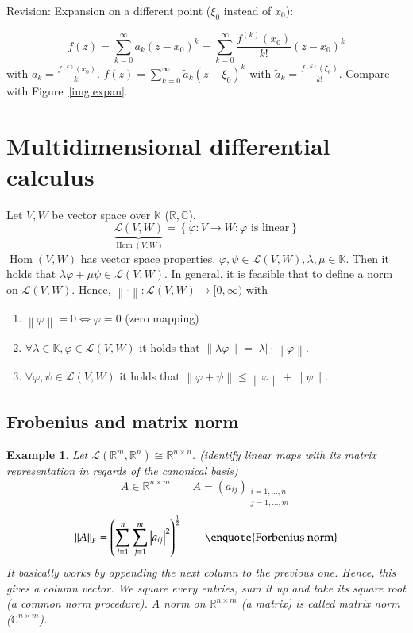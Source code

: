 \documentclass{article}
\newtheorem{example}{Example}  \numberwithin{example}{section}
\newcommand{\set}[1]{\left\{#1\right\}}
\newcommand{\norm}[1]{\left\|#1\right\|}
\newcommand{\card}[1]{\left|#1\right|}
\begin{document}
Revision: Expansion on a different point ($\xi_0$ instead of $x_0$):

\[ f(z) = \sum_{k=0}^\infty a_k (z - x_0)^k = \sum_{k=0}^\infty \frac{f^{(k)}(x_0)}{k!} (z - x_0)^k \]
with $a_k = \frac{f^{(k)}(x_0)}{k!}$. $f(z) = \sum_{k=0}^\infty \tilde a_k(z - \xi_0)^k$ with $\tilde a_k = \frac{f^{(k)}(\xi_0)}{k!}$.
Compare with Figure~\ref{img:expan}.

\section{Multidimensional differential calculus} %

Let $V,W$ be vector space over $\mathbb K$ ($\mathbb R, \mathbb C$).
\[ \underbrace{\mathcal L(V, W)}_{\operatorname{Hom}(V, W)} = \set{\varphi: V \to W: \varphi \text{ is linear}} \]
$\operatorname{Hom}(V, W)$ has vector space properties.
$\varphi, \psi \in \mathcal L(V, W), \lambda, \mu \in \mathbb K$.
Then it holds that $\lambda \varphi + \mu \psi \in \mathcal L(V, W)$.
In general, it is feasible that to define a norm on $\mathcal L(V, W)$.
Hence, $\norm{\cdot}: \mathcal L(V, W) \to [0, \infty)$ with
\begin{enumerate}
  \item $\norm{\varphi} = 0 \iff \varphi = 0$ (zero mapping)
  \item $\forall \lambda \in \mathbb K, \varphi \in \mathcal L(V, W)$ it holds that $\norm{\lambda \varphi} = \card{\lambda} \cdot \norm{\varphi}$.
  \item $\forall \varphi, \psi \in \mathcal L(V, W)$ it holds that $\norm{\varphi + \psi} \leq \norm{\varphi} + \norm{\psi}$.
\end{enumerate}

\subsection{Frobenius and matrix norm}

\begin{example}
  Let $\mathcal L(\mathbb R^m, \mathbb R^n) \cong \mathbb R^{n \times n}$.
  (identify linear maps with its matrix representation in regards of the canonical basis)
  \[ A \in \mathbb R^{n \times m} \qquad A = (a_{ij})_{\substack{i=1,\dots,n \\ j=1,\dots,m}} \]
  \[ \norm{A}_F = \left(\sum_{i=1}^n \sum_{j=1}^m \card{a_{ij}}^2\right)^{\frac12} \qquad \text{\enquote{Forbenius norm}} \]
  It basically works by appending the next column to the previous one. Hence, this gives a column vector. We square every entries, sum it up and take its square root (a common norm procedure).
  A norm on $\mathbb R^{n \times m}$ (a matrix) is called \emph{matrix norm} ($\mathbb C^{n \times m}$).
\end{example}
\end{document}
